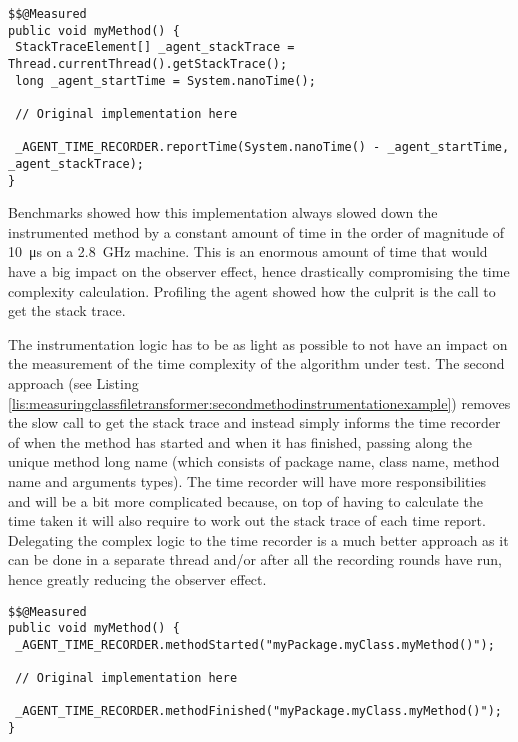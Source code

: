 \begin{lstlisting}[breaklines,caption={Method instrumentation example (first approach)},label=lis:measuringclassfiletransformer:firstmethodinstrumentationexample]
$$@Measured
public void myMethod() {
 StackTraceElement[] _agent_stackTrace = Thread.currentThread().getStackTrace();
 long _agent_startTime = System.nanoTime();

 // Original implementation here

 _AGENT_TIME_RECORDER.reportTime(System.nanoTime() - _agent_startTime, _agent_stackTrace);
}
\end{lstlisting}

\noindent Benchmarks showed how this implementation always slowed down the instrumented method by a constant amount of time in the order of magnitude of \SI{10}{\micro\second} on a \SI{2.8}{\giga\hertz} machine. This is an enormous amount of time that would have a big impact on the observer effect, hence drastically compromising the time complexity calculation. Profiling the agent showed how the culprit is the call to get the stack trace.

\noindent The instrumentation logic has to be as light as possible to not have an impact on the measurement of the time complexity of the algorithm under test. The second approach (see Listing \ref{lis:measuringclassfiletransformer:secondmethodinstrumentationexample}) removes the slow call to get the stack trace and instead simply informs the time recorder of when the method has started and when it has finished, passing along the unique method long name (which consists of package name, class name, method name and arguments types). The time recorder will have more responsibilities and will be a bit more complicated because, on top of having to calculate the time taken it will also require to work out the stack trace of each time report. Delegating the complex logic to the time recorder is a much better approach as it can be done in a separate thread and/or after all the recording rounds have run, hence greatly reducing the observer effect.

\begin{lstlisting}[breaklines,caption={Method instrumentation example (second approach)},label=lis:measuringclassfiletransformer:secondmethodinstrumentationexample]
$$@Measured
public void myMethod() {
 _AGENT_TIME_RECORDER.methodStarted("myPackage.myClass.myMethod()");

 // Original implementation here

 _AGENT_TIME_RECORDER.methodFinished("myPackage.myClass.myMethod()");
}
\end{lstlisting}


